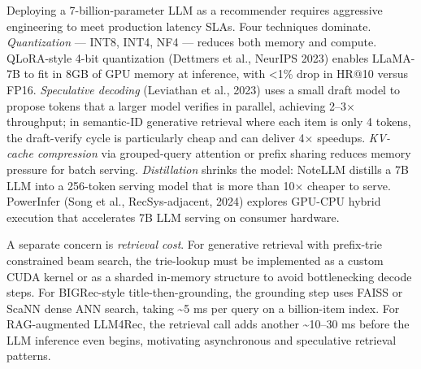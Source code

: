 \documentclass{article}
\begin{document}
Deploying a 7-billion-parameter LLM as a recommender requires aggressive engineering to meet production latency SLAs. Four techniques dominate. \emph{Quantization} --- INT8, INT4, NF4 --- reduces both memory and compute. QLoRA-style 4-bit quantization (Dettmers et al., NeurIPS 2023) enables LLaMA-7B to fit in 8GB of GPU memory at inference, with \textless1\% drop in HR@10 versus FP16. \emph{Speculative decoding} (Leviathan et al., 2023) uses a small draft model to propose tokens that a larger model verifies in parallel, achieving 2--3× throughput; in semantic-ID generative retrieval where each item is only 4 tokens, the draft-verify cycle is particularly cheap and can deliver 4× speedups. \emph{KV-cache compression} via grouped-query attention or prefix sharing reduces memory pressure for batch serving. \emph{Distillation} shrinks the model: NoteLLM distills a 7B LLM into a 256-token serving model that is more than 10× cheaper to serve. PowerInfer (Song et al., RecSys-adjacent, 2024) explores GPU-CPU hybrid execution that accelerates 7B LLM serving on consumer hardware.

A separate concern is \emph{retrieval cost}. For generative retrieval with prefix-trie constrained beam search, the trie-lookup must be implemented as a custom CUDA kernel or as a sharded in-memory structure to avoid bottlenecking decode steps. For BIGRec-style title-then-grounding, the grounding step uses FAISS or ScaNN dense ANN search, taking \textasciitilde5 ms per query on a billion-item index. For RAG-augmented LLM4Rec, the retrieval call adds another \textasciitilde10--30 ms before the LLM inference even begins, motivating asynchronous and speculative retrieval patterns.
\end{document}
